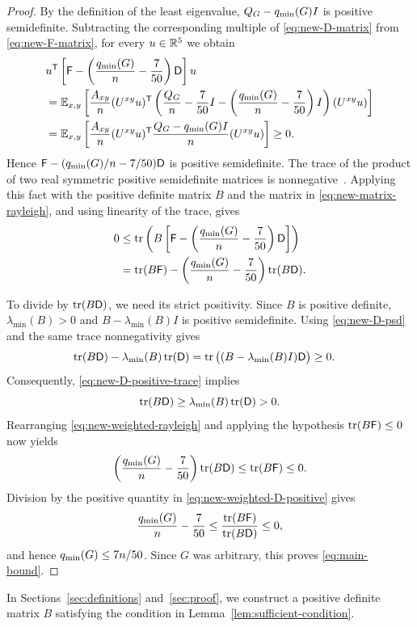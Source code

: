 \begin{proof}
By the definition of the least eigenvalue,
$Q_G-q_{\min}(G)I$ is positive semidefinite.
Subtracting the corresponding multiple of \eqref{eq:new-D-matrix}
from \eqref{eq:new-F-matrix}, for every $u\in\mathbb R^5$ we obtain
\begin{align}
&u^{\mathsf T}\left[
\mathsf F-\left(\frac{q_{\min}(G)}n-\frac7{50}\right)\mathsf D
\right]u\notag\\
&=\mathbb E_{x,y}\left[\frac{A_{xy}}n
(U^{xy}u)^{\mathsf T}
\left(\frac{Q_G}n-\frac7{50}I
-\left(\frac{q_{\min}(G)}n-\frac7{50}\right)I\right)
(U^{xy}u)\right]\notag\\
&=\mathbb E_{x,y}\left[\frac{A_{xy}}n
(U^{xy}u)^{\mathsf T}
\frac{Q_G-q_{\min}(G)I}{n}
(U^{xy}u)\right]\geq0.
\label{eq:new-matrix-rayleigh}
\end{align}
Hence
$\mathsf F-(q_{\min}(G)/n-7/50)\mathsf D$ is positive semidefinite.
The trace of the product of two real symmetric positive semidefinite
matrices is nonnegative~\cite[Example~2.24]{BoydVandenberghe}.
Applying this fact with the positive definite matrix $B$ and the matrix
in \eqref{eq:new-matrix-rayleigh}, and using linearity of the trace, gives
\begin{align}
0
&\leq\operatorname{tr}\left(B\left[
\mathsf F-\left(\frac{q_{\min}(G)}n-\frac7{50}\right)\mathsf D
\right]\right)\notag\\
&=\operatorname{tr}(B\mathsf F)
-\left(\frac{q_{\min}(G)}n-\frac7{50}\right)\operatorname{tr}(B\mathsf D).
\label{eq:new-weighted-rayleigh}
\end{align}

To divide by $\operatorname{tr}(B\mathsf D)$, we need its strict positivity.
Since $B$ is positive definite,
$\lambda_{\min}(B)>0$ and
$B-\lambda_{\min}(B)I$ is positive semidefinite.
Using \eqref{eq:new-D-psd} and the same trace nonnegativity gives
\begin{align*}
\operatorname{tr}(B\mathsf D)-\lambda_{\min}(B)\operatorname{tr}(\mathsf D)
&=\operatorname{tr}\big((B-\lambda_{\min}(B)I)\mathsf D\big)\geq0.
\end{align*}
Consequently, \eqref{eq:new-D-positive-trace} implies
\begin{equation}\label{eq:new-weighted-D-positive}
\operatorname{tr}(B\mathsf D)
\geq\lambda_{\min}(B)\operatorname{tr}(\mathsf D)>0.
\end{equation}
Rearranging \eqref{eq:new-weighted-rayleigh} and applying the hypothesis
$\operatorname{tr}(B\mathsf F)\leq0$ now yields
\[
\left(\frac{q_{\min}(G)}n-\frac7{50}\right)\operatorname{tr}(B\mathsf D)
\leq\operatorname{tr}(B\mathsf F)\leq0.
\]
Division by the positive quantity in
\eqref{eq:new-weighted-D-positive} gives
\[
\frac{q_{\min}(G)}n-\frac7{50}
\leq\frac{\operatorname{tr}(B\mathsf F)}{\operatorname{tr}(B\mathsf D)}\leq0,
\]
and hence $q_{\min}(G)\leq7n/50$.
Since $G$ was arbitrary, this proves \eqref{eq:main-bound}.
\end{proof}

In Sections~\ref{sec:definitions} and~\ref{sec:proof}, we construct a positive
definite matrix $B$ satisfying the condition in Lemma~\ref{lem:sufficient-condition}.
